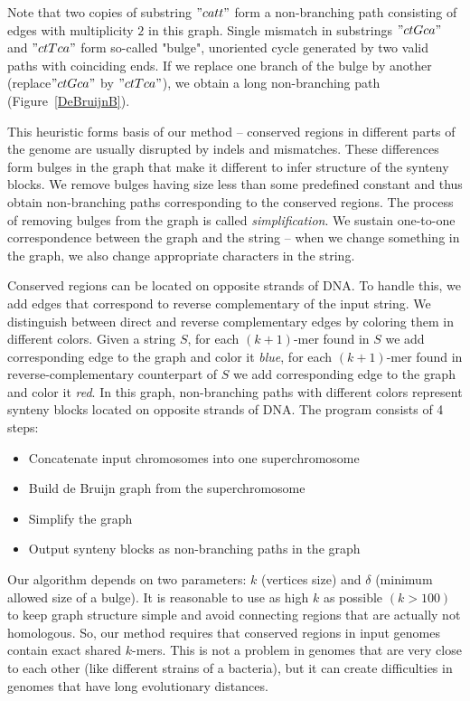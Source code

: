 \documentclass[a4paper, 12pt]{scrartcl}
\begin{document}
Note that two copies of substring \("catt"\) form a non-branching path consisting of edges with multiplicity \(2\) in this graph. Single
mismatch in substrings \("ctGca"\) and \("ctTca"\) form so-called "bulge", unoriented cycle generated by two valid paths with
coinciding ends. If we replace one branch of the bulge by another (replace\("ctGca"\) by \("ctTca"\)), we obtain
a long non-branching path (Figure~\ref{DeBruijnB}).

This heuristic forms basis of our method -- conserved regions in different parts of the genome are usually 
disrupted by indels and mismatches. These differences form bulges in the graph that make it different to infer
structure of the synteny blocks. We remove bulges having size less than some predefined constant and thus obtain non-branching
paths corresponding to the conserved regions. The process of removing bulges from the graph is called \textit{simplification}. We
sustain one-to-one correspondence between the graph and the string -- when we change something in the graph, we also change
appropriate characters in the string.

Conserved regions can be located on opposite strands of DNA. To handle this, we add edges that correspond to reverse complementary
of the input string. We distinguish between direct and reverse complementary edges by coloring them in different colors.
Given a string \(S\), for each \((k + 1)\)-mer found in \(S\) we add corresponding edge to the graph and color it \textit{blue}, for 
each \((k + 1)\)-mer found in reverse-complementary counterpart of \(S\) we add corresponding edge to the graph and color it \textit{red}.
In this graph, non-branching paths with different colors represent synteny blocks located on opposite strands of DNA. The program 
consists of 4 steps:
\begin{itemize}
    \item Concatenate input chromosomes into one superchromosome 
    \item Build de Bruijn graph from the superchromosome 
    \item Simplify the graph 
    \item Output synteny blocks as non-branching paths in the graph 
\end{itemize}

Our algorithm depends on two parameters: \(k\) (vertices size) and \(\delta\) (minimum allowed size of a bulge). It is reasonable to use as high \(k\) as possible
\((k > 100)\) to keep graph structure simple and avoid connecting regions that are actually not homologous. So, our method requires that conserved regions
in input genomes contain exact shared \(k\)-mers. This is not a problem in genomes that are very close to each other (like different strains of a bacteria),
but it can create difficulties in genomes that have long evolutionary distances. 
\end{document}
